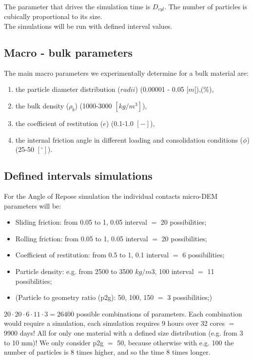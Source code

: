 The parameter that drives the simulation time is $D_{cyl}$. The number of particles is cubically proportional to its size. \\
The simulations will be run with defined interval values.\\

\subsection{Macro - bulk parameters}
\label{subsection:macroparameters}

The main macro parameters we experimentally determine for a bulk material are:

\begin{enumerate}[label=(\alph*)]
\item{the particle diameter distribution ($radii$) (0.00001 - 0.05 $[m[$),(\%),}
\item{the bulk density ($\rho_b$) (1000-3000 $[kg/m^3]$),}
\item{the coefficient of restitution ($e$) (0.1-1.0 $[-]$),}
\item{the internal friction angle in different loading and consolidation conditions ($\phi$) (25-50 $[^\circ]$).}
\end{enumerate}


\subsection{Defined intervals simulations}
\label{subsection:definedintervalssimulations}
For the Angle of Repose simulation the individual contacts micro-DEM parameters will be:
\begin{itemize}
\item{Sliding friction: from 0.05 to 1, 0.05 interval $=$ 20 possibilities;}
\item{Rolling friction: from 0.05 to 1, 0.05 interval $=$ 20 possibilities;}
\item{Coefficient  of restitution: from 0.5 to 1, 0.1 interval $=$ 6 possibilities;}
\item{Particle density: e.g. from 2500 to 3500 $kg/m3$, 100 interval $=$ 11 possibilities;}
\item{(Particle to geometry ratio (p2g): 50, 100, 150 $=$ 3 possibilities;)}
\end{itemize}
$20 \cdot 20 \cdot 6 \cdot 11 \cdot 3 = 26400$ possible combinations of parameters.
Each combination would require a simulation, each simulation requires 9 hours over 32 cores $=$ 9900 days!
All for only one material with a defined size distribution (e.g. from 3 to 10 mm)!
We only consider p2g $=$ 50, because otherwise with e.g. 100 the number of particles is 8 times higher, and so the time 8 times longer.

